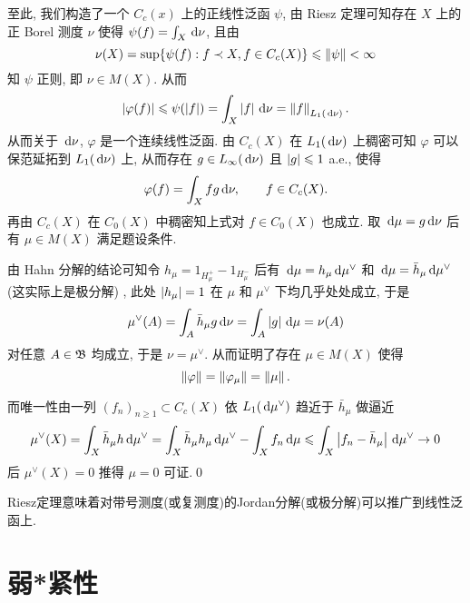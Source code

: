 \begin{Proof}
		至此, 我们构造了一个 $ C_c(x) $ 上的正线性泛函 $ \psi $, 由 Riesz 定理可知存在 $ X $ 上的正 Borel 测度 $ \nu $ 使得 $ \psi(f)=\int_X\,\mathrm{d}\nu $, 且由
		\[
			\nu(X)=\sup\{\psi(f) : f\prec X, f\in C_c(X)\}\leqslant\left\| \psi \right\|<\infty
		\]
		知 $ \psi $ 正则, 即 $ \nu\in M(X) $. 从而
		\[
			\left| \varphi(f) \right| \leqslant\psi(\left| f \right| )=\int_X\left| f \right| \,\mathrm{d}\nu=\left\| f \right\|_{L_1(\,\mathrm{d}\nu)}.
		\]
		从而关于 $ \,\mathrm{d}\nu $, $ \varphi $ 是一个连续线性泛函. 由 $ C_c(X) $ 在 $ L_1(\,\mathrm{d}\nu) $ 上稠密可知 $ \varphi $ 可以保范延拓到 $ L_1(\,\mathrm{d}\nu) $ 上, 从而存在 $ g\in L_\infty(\,\mathrm{d}\nu) $ 且 $ \left| g \right| \leqslant 1 $ a.e., 使得
		\[
			\varphi(f)=\int_Xfg\,\mathrm{d}\nu,\qquad f\in C_c(X).
		\]
		再由 $ C_c(X) $ 在 $ C_0(X) $ 中稠密知上式对 $ f\in C_0(X) $ 也成立. 取 $ \,\mathrm{d}\mu=g\,\mathrm{d}\nu $ 后有 $ \mu\in M(X) $ 满足题设条件.

		由 Hahn 分解的结论可知令 $ h_\mu=1_{H_\mu^+}-1_{H_\mu^-} $ 后有 $ \,\mathrm{d}\mu=h_\mu\,\mathrm{d}\mu^\lor $ 和 $ \,\mathrm{d}\mu=\bar{h}_\mu\,\mathrm{d}\mu^\lor $ (这实际上是极分解) , 此处 $ \left| h_\mu \right| =1 $ 在 $ \mu $ 和 $ \mu^\lor $ 下均几乎处处成立, 于是
		\[
			\mu^\lor(A)=\int_A\bar{h}_\mu g\,\mathrm{d}\nu=\int_A\left| g \right| \,\mathrm{d}\mu=\nu(A)
		\]
		对任意 $ A\in\mathfrak{B} $ 均成立, 于是 $ \nu=\mu^\lor $. 从而证明了存在 $ \mu\in M(X) $ 使得
		\[
			\left\| \varphi \right\|=\left\| \varphi_\mu \right\|=\left\| \mu \right\|.
		\]

		而唯一性由一列 $ (f_n)_{n\geqslant 1}\subset C_c(X) $ 依 $ L_1(\,\mathrm{d}\mu^\lor) $ 趋近于 $ \bar{h}_\mu $ 做逼近
		\[
			\mu^\lor(X)=\int_X\bar{h}_\mu h\,\mathrm{d}\mu^\lor=\int_X\bar{h}_\mu h_\mu\,\mathrm{d}\mu^\lor-\int_Xf_n\,\mathrm{d}\mu\leqslant\int_X\left| f_n-\bar{h}_\mu \right| \,\mathrm{d}\mu^\lor\to 0
		\]
		后 $ \mu^\lor(X)=0 $ 推得 $ \mu=0 $ 可证.\qed
	\end{Proof}

	Riesz定理意味着对带号测度(或复测度)的Jordan分解(或极分解)可以推广到线性泛函上.


\section{弱*紧性}
	
